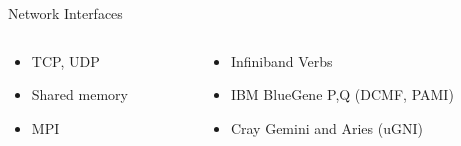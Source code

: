 \begin{frame}
{{\begin{block}{\small Network Interfaces}
\begin{columns}
\begin{column}{0.45\textwidth}
        \begin{itemize}
            \item TCP, UDP
            \item Shared memory
            \item MPI
        \end{itemize}
    \end{column}
    \begin{column}{0.45\textwidth}
        \begin{itemize}
            \item Infiniband Verbs
            \item IBM BlueGene P,Q (DCMF, PAMI)
            \item Cray Gemini and Aries (uGNI)
        \end{itemize}
    \end{column}
    \end{columns}
\end{block}
}
}
\end{frame}


